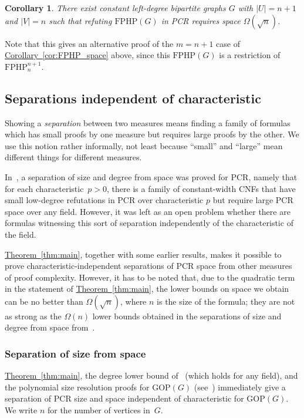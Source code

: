 \documentclass[11pt]{article}
\numberwithin{equation}{section}
\newtheorem{corollary}[theorem]{Corollary}
\theoremstyle{definition}
\theoremstyle{plain}
\newcommand{\expref}[2]{\hyperref[#2]{#1~\ref{#2}}}
\newcommand\GOP{\mathrm{GOP}}
\newcommand\FPHP{\mathrm{FPHP}}
\begin{document}
\begin{corollary}
There exist constant left-degree bipartite graphs $G$ with $|U| = n+1$  and $|V| =n$ such that
refuting $\FPHP(G)$ in PCR requires space $\Omega(\sqrt{n})$.
\end{corollary}

Note that this gives an alternative proof of the $m=n+1$ case of \expref{Corollary}{cor:FPHP_space} above, 
since this $\FPHP(G)$ is a restriction of $\FPHP^{n+1}_n$.

\subsection{Separations independent of characteristic}

Showing a \emph{separation} between two measures means
finding a family of formulas which
has small proofs by one measure but requires large
proofs by the other. We use this notion rather informally,
not least because ``small'' and ``large'' mean different things
for different measures.

In~\cite{DBLP:conf/icalp/FilmusLMNV13}, a separation of size and degree from space was proved for PCR, namely that
for each characteristic~$p>0$, there is a family of constant-width CNFs that have small low-degree refutations in PCR over characteristic $p$ but require large PCR space over any field. However, it was left as an open problem whether there are formulas witnessing this sort of separation 
independently of the characteristic of the field.

\expref{Theorem}{thm:main}, together with some earlier results, makes it possible to prove characteristic-independent separations of PCR space from other measures of proof complexity. However, it has to be noted that, due to the quadratic term in the statement of \expref{Theorem}{thm:main}, the 
lower bounds on space we obtain can be no better than $\Omega(\sqrt{n})$, where $n$ is the size of the formula;  they are not as strong as the
$\Omega(n)$ lower bounds obtained in the separations of size and degree from space from~\cite{DBLP:conf/icalp/FilmusLMNV13}.



\subsubsection{Separation of size from space}



\expref{Theorem}{thm:main}, the degree lower bound of~\cite{DBLP:journals/tocl/GalesiL10} 
(which holds for any field), and the polynomial size resolution proofs for $\GOP(G)$ 
(see~\cite{DBLP:journals/tocl/GalesiL10}) immediately give a separation of PCR size and space
independent of characteristic for $\GOP(G)$.  We write $n$ for the number of vertices in~$G$.
\end{document}
